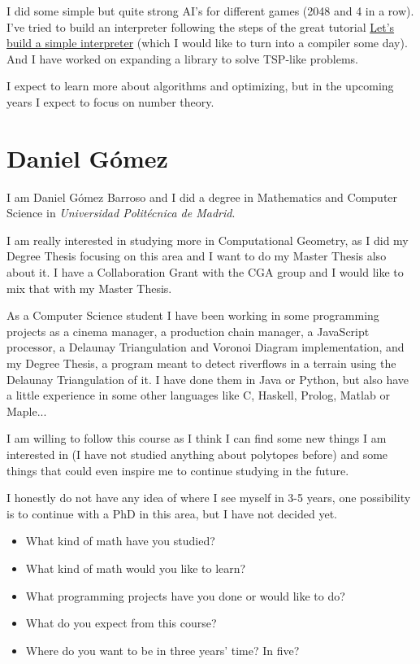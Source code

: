 \documentclass[11pt]{amsart}
\begin{document}
I did some simple but quite strong AI's for different games (2048 and 4 in a row). I've tried to build an interpreter following the steps of the great tutorial \href{https://ruslanspivak.com/lsbasi-part1/}{Let’s build a simple interpreter} (which I would like to turn into a compiler some day). And I have worked on expanding a library to solve TSP-like problems.

I expect to learn more about algorithms and optimizing, but in the upcoming years I expect to focus on number theory.

\medskip

\section*{Daniel Gómez}

I am Daniel Gómez Barroso and I did a degree in Mathematics and Computer Science in \textit{Universidad Politécnica de Madrid}.

I am really interested in studying more in Computational Geometry, as I did my Degree Thesis focusing on this area and I want to do my Master Thesis also about it. I have a Collaboration Grant with the CGA group and I would like to mix that with my Master Thesis.

As a Computer Science student I have been working in some programming projects as a cinema manager, a production chain manager, a JavaScript processor, a Delaunay Triangulation and Voronoi Diagram implementation, and my Degree Thesis, a program meant to detect riverflows in a terrain using the Delaunay Triangulation of it. I have done them in Java or Python, but also have a little experience in some other languages like C, Haskell, Prolog, Matlab or Maple...

I am willing to follow this course as I think I can find some new things I am interested in (I have not studied anything about polytopes before) and some things that could even inspire me to continue studying in the future.

I honestly do not have any idea of where I see myself in 3-5 years, one possibility is to continue with a PhD in this area, but I have not decided yet.

\medskip


\begin{itemize}
\item What kind of math have you studied?
\item What kind of math would you like to learn?
\item What programming projects have you done or would like to do?
\item What do you expect from this course?
\item Where do you want to be in three years' time? In five?
\end{itemize}
\end{document}
